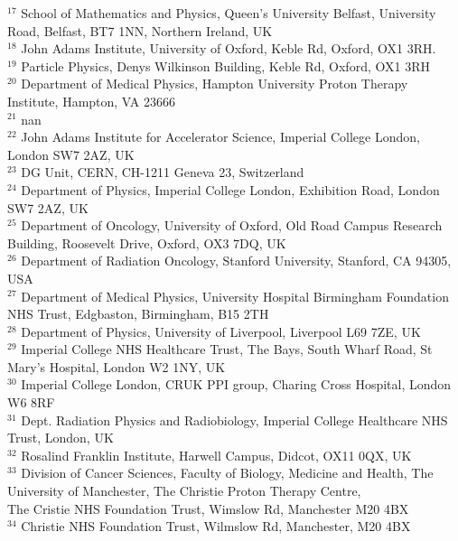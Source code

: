 {\begin{tabbing}
     $^{17}$ \> School of Mathematics and Physics, Queen's University Belfast, University Road, Belfast, BT7 1NN, Northern Ireland, UK\\
     $^{18}$ \> John Adams Institute, University of Oxford, Keble Rd, Oxford, OX1 3RH.\\
     $^{19}$ \> Particle Physics, Denys Wilkinson Building, Keble Rd, Oxford, OX1 3RH\\
     $^{20}$ \> Department of Medical Physics, Hampton University Proton Therapy Institute, Hampton, VA 23666\\
     $^{21}$ \> nan\\
     $^{22}$ \> John Adams Institute for Accelerator Science, Imperial College London, London SW7 2AZ, UK\\
     $^{23}$ \> DG Unit, CERN, CH-1211 Geneva 23, Switzerland\\
     $^{24}$ \> Department of Physics, Imperial College London, Exhibition Road, London SW7 2AZ, UK\\
     $^{25}$ \> Department of Oncology, University of Oxford, Old Road Campus Research Building, Roosevelt Drive, Oxford, OX3 7DQ, UK\\
     $^{26}$ \> Department of Radiation Oncology, Stanford University, Stanford, CA 94305, USA\\
     $^{27}$ \> Department of Medical Physics, University Hospital Birmingham Foundation NHS Trust, Edgbaston, Birmingham, B15 2TH\\
     $^{28}$ \> Department of Physics, University of Liverpool, Liverpool L69 7ZE, UK\\
     $^{29}$ \> Imperial College NHS Healthcare Trust, The Bays, South Wharf Road, St Mary's Hospital, London W2 1NY, UK\\
     $^{30}$ \> Imperial College London, CRUK PPI group, Charing Cross Hospital, London W6 8RF\\
     $^{31}$ \> Dept. Radiation Physics and Radiobiology, Imperial College Healthcare NHS Trust, London, UK\\
     $^{32}$ \> Rosalind Franklin Institute, Harwell Campus, Didcot, OX11 0QX, UK\\
     $^{33}$ \> Division of Cancer Sciences, Faculty of Biology, Medicine and Health, The University of Manchester, The Christie Proton Therapy Centre, \\ \> The Cristie NHS Foundation Trust, Wimslow Rd, Manchester M20 4BX\\
     $^{34}$ \> Christie NHS Foundation Trust, Wilmslow Rd, Manchester, M20 4BX\\

\end{tabbing}}

